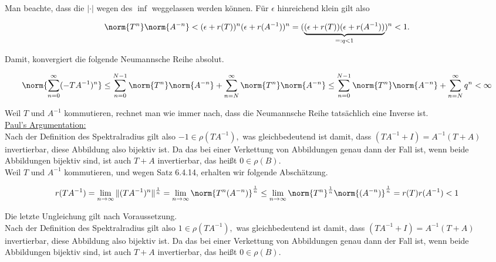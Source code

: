 \begin{solution}
Man beachte, dass die $|\cdot|$ wegen des $\inf$ weggelassen werden können.
Für $\epsilon$ hinreichend klein gilt also

\begin{align*}
  \norm{T^n} \norm{A^{-n}}
  <
  (\epsilon + r(T))^n
  (\epsilon + r(A^{-1}))^n
  =
  (
    \underbrace
    {
      (\epsilon + r(T))
      (\epsilon + r(A^{-1}))
    }_{=: q < 1}
  )^n < 1.
\end{align*}

Damit, konvergiert die folgende Neumannsche Reihe absolut.

\begin{align*}
  \norm{\sum_{n = 0}^\infty (-T A^{-1})^n}
  \leq
  \sum_{n = 0}^{N-1} \norm{T^n} \norm{A^{-n}} +
  \sum_{n = N}^\infty \norm{T^n} \norm{A^{-n}}
  \leq
  \sum_{n = 0}^{N-1} \norm{T^n} \norm{A^{-n}} +
  \sum_{n = N}^\infty q^n
  < \infty
\end{align*}

Weil $T$ und $A^{-1}$ kommutieren, rechnet man wie immer nach, dass die Neumannsche Reihe tatsächlich eine Inverse ist. \\

\underline{Paul's Argumentation:} \\

Nach der Definition des Spektralradius gilt also $-1 \in \rho(TA^{-1}),$ was gleichbedeutend ist damit, dass $(TA^{-1} + I) = A^{-1} (T + A)$ invertierbar, diese Abbildung also bijektiv ist.
Da das bei einer Verkettung von Abbildungen genau dann der Fall ist, wenn beide Abbildungen bijektiv sind, ist auch $T + A$ invertierbar, das heißt $0 \in \rho(B).$ \\

Weil $T$ und $A^{-1}$ kommutieren, und wegen Satz 6.4.14, erhalten wir folgende Abschätzung.

\begin{align*}
    r(TA^{-1})
    =
    \lim_{n \to \infty}{\|(TA^{-1})^n\|^{\frac{1}{n}}}
    =
    \lim_{n \to \infty}
    \norm{T^n(A^{-n})}^\frac{1}{n}
    \leq
    \lim_{n \to \infty}
    \norm{T^n}^\frac{1}{n}
    \norm{(A^{-n})}^\frac{1}{n}
    =
    r(T) r(A^{-1}) < 1
\end{align*}

Die letzte Ungleichung gilt nach Voraussetzung. \\

Nach der Definition des Spektralradius gilt also $1 \in \rho(TA^{-1}),$ was gleichbedeutend ist damit, dass $(TA^{-1} + I) = A^{-1} (T + A)$ invertierbar, diese Abbildung also bijektiv ist. Da das bei einer Verkettung von Abbildungen genau dann der Fall ist, wenn beide Abbildungen bijektiv sind, ist auch $T + A$ invertierbar, das heißt $0 \in \rho(B).$ \\


\end{solution}
